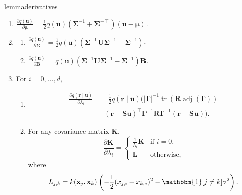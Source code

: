 \documentclass{mpaper}
\DeclareMathOperator{\adj}{adj}
\DeclareMathOperator{\tr}{tr}
\begin{document}
\begin{restatable}{lemma}{derivatives} \label{lemma:derivatives}
  \leavevmode
  \begin{enumerate}
  \item $\frac{\partial q(\mathbf{u})}{\partial \bm\mu} =
    \frac{1}{2}q(\mathbf{u})(\bm\Sigma^{-1} + \bm\Sigma^{-\intercal})(\mathbf{u}
    - \bm\mu)$.
  \item
    \begin{enumerate}
    \item
      $\frac{\partial q(\mathbf{u})}{\partial \bm\Sigma} =
      \frac{1}{2}q(\mathbf{u})(\bm\Sigma^{-1}\mathbf{U}\bm\Sigma^{-1} -
      \bm\Sigma^{-1})$.
    \item
      $\frac{\partial q(\mathbf{u})}{\partial \mathbf{B}} =
      q(\mathbf{u})(\bm\Sigma^{-1}\mathbf{U}\bm\Sigma^{-1} -
      \bm\Sigma^{-1})\mathbf{B}$.
    \end{enumerate}
  \item For $i = 0, \dots, d$,
    \begin{enumerate}
    \item
      \begin{align*}
        \frac{\partial q(\mathbf{r} \mid \mathbf{u})}{\partial \lambda_i} &= \frac{1}{2}q(\mathbf{r} \mid \mathbf{u}) (|\bm\Gamma|^{-1} \tr(\mathbf{R} \adj(\bm\Gamma)) \\
                                                                          &- (\mathbf{r} - \mathbf{Su})^\intercal\bm\Gamma^{-1}\mathbf{R}\bm\Gamma^{-1}(\mathbf{r} - \mathbf{Su})).
      \end{align*}
    \item For any covariance matrix $\mathbf{K}$,
      \[
        \frac{\partial \mathbf{K}}{\partial \lambda_i} =
        \begin{cases}
          \frac{1}{\lambda_i}\mathbf{K} & \text{if } i = 0, \\
          \mathbf{L} & \text{otherwise,}
        \end{cases}
      \]
      where
      \[
        L_{j,k} = k(\mathbf{x}_j, \mathbf{x}_k) \left( -\frac{1}{2}(x_{j,i} -
          x_{k,i})^2 - \mathbbm{1}[j \ne k]\sigma^2 \right).
      \]
    \end{enumerate}
  \end{enumerate}
\end{restatable}
\end{document}
